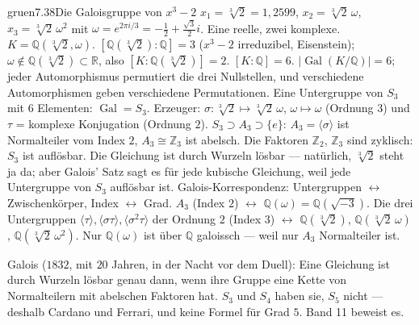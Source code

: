 \begin{loesungkarte}{gruen}{7.38}{Die Galoisgruppe von $x^{3} - 2$}
$x_1 = \sqrt[3]2 = 1{,}2599$, $x_2 = \sqrt[3]2\,\omega$, $x_3 = \sqrt[3]2\,\omega^{2}$ mit $\omega = e^{2\pi i/3} = -\frac12 + \frac{\sqrt3}2i$. Eine reelle, zwei komplexe.
$K = \mathbb Q(\sqrt[3]2, \omega)$. $[\mathbb Q(\sqrt[3]2) : \mathbb Q] = 3$ ($x^{3} - 2$ irreduzibel, Eisenstein); $\omega\notin\mathbb Q(\sqrt[3]2)\subset\mathbb R$, also $[K : \mathbb Q(\sqrt[3]2)] = 2$. $[K : \mathbb Q] = 6$.
$|\operatorname{Gal}(K/\mathbb Q)| = 6$; jeder Automorphismus permutiert die drei Nullstellen, und verschiedene Automorphismen geben verschiedene Permutationen. Eine Untergruppe von $S_3$ mit $6$ Elementen: $\operatorname{Gal} = S_3$. Erzeuger: $\sigma\colon\sqrt[3]2\mapsto\sqrt[3]2\,\omega$, $\omega\mapsto\omega$ (Ordnung $3$) und $\tau$ = komplexe Konjugation (Ordnung $2$).
$S_3\supset A_3\supset\{e\}$: $A_3 = \langle\sigma\rangle$ ist Normalteiler vom Index $2$, $A_3\cong\mathbb Z_3$ ist abelsch. Die Faktoren $\mathbb Z_2$, $\mathbb Z_3$ sind zyklisch: $S_3$ ist auflösbar. Die Gleichung ist durch Wurzeln lösbar --- natürlich, $\sqrt[3]2$ steht ja da; aber Galois' Satz sagt es für jede kubische Gleichung, weil jede Untergruppe von $S_3$ auflösbar ist.
Galois-Korrespondenz: Untergruppen $\leftrightarrow$ Zwischenkörper, Index $\leftrightarrow$ Grad. $A_3$ (Index $2$) $\leftrightarrow$ $\mathbb Q(\omega) = \mathbb Q(\sqrt{-3})$. Die drei Untergruppen $\langle\tau\rangle, \langle\sigma\tau\rangle, \langle\sigma^{2}\tau\rangle$ der Ordnung $2$ (Index $3$) $\leftrightarrow$ $\mathbb Q(\sqrt[3]2)$, $\mathbb Q(\sqrt[3]2\,\omega)$, $\mathbb Q(\sqrt[3]2\,\omega^{2})$. Nur $\mathbb Q(\omega)$ ist über $\mathbb Q$ galoissch --- weil nur $A_3$ Normalteiler ist.
\begin{mitnehmen}\kastentext
Galois ($1832$, mit $20$ Jahren, in der Nacht vor dem Duell): Eine Gleichung ist durch Wurzeln lösbar genau dann, wenn ihre Gruppe eine Kette von Normalteilern mit abelschen Faktoren hat. $S_3$ und $S_4$ haben sie, $S_5$ nicht --- deshalb Cardano und Ferrari, und keine Formel für Grad $5$. Band 11 beweist es.
\end{mitnehmen}
\end{loesungkarte}

